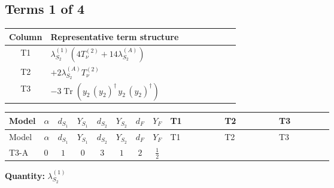 \documentclass[8pt]{article}
\begin{document}
\begin{landscape}
\subsection*{Terms 1 of 4}
\begin{center}
\begin{tabular}{@{}c >{\raggedright\arraybackslash}p{0.82\linewidth}@{}}
\toprule
Column & Representative term structure \\
\midrule
T1 & \(\displaystyle {\lambda_{S_2}^{(1)}} (4 T_{\nu}^{(2)}+14 {\lambda_{S_2}^{(A)}})\) \\
\midrule
T2 & \(\displaystyle +2 {\lambda_{S_2}^{(A)}} T_{\nu}^{(2)}\) \\
\midrule
T3 & \(\displaystyle -3 \operatorname{Tr}\!\left({y_2}\,\left({y_2}\right)^{\dagger}\,{y_2}\,\left({y_2}\right)^{\dagger}\right)\) \\
\midrule
\bottomrule
\end{tabular}
\end{center}
\smallskip
\tiny
\begin{longtable}{@{}llcccccc >{\raggedright\arraybackslash}p{0.21\linewidth} >{\raggedright\arraybackslash}p{0.21\linewidth} >{\raggedright\arraybackslash}p{0.21\linewidth}@{}}
\toprule
Model & $\alpha$ & $d_{S_1}$ & $Y_{S_1}$ & $d_{S_2}$ & $Y_{S_2}$ & $d_F$ & $Y_F$ & T1 & T2 & T3 \\
\midrule
\endfirsthead
\toprule
Model & $\alpha$ & $d_{S_1}$ & $Y_{S_1}$ & $d_{S_2}$ & $Y_{S_2}$ & $d_F$ & $Y_F$ & T1 & T2 & T3 \\
\midrule
\endhead
T3-A & $0$ & $1$ & $0$ & $3$ & $1$ & $2$ & $\frac{1}{2}$ & \scriptsize\adjustbox{max width=\linewidth}{$\begin{gathered} {\lambda_{S_2}^{(1)}} (4 T_{\nu}^{(2)}+14 {\lambda_{S_2}^{(A)}})\end{gathered}$} & \scriptsize\adjustbox{max width=\linewidth}{$\begin{gathered} +2 {\lambda_{S_2}^{(A)}} T_{\nu}^{(2)}\end{gathered}$} & \scriptsize\adjustbox{max width=\linewidth}{$\begin{gathered} -3 \operatorname{Tr}\!\left({y_2}\,\left({y_2}\right)^{\dagger}\,{y_2}\,\left({y_2}\right)^{\dagger}\right)\end{gathered}$} \\
\midrule
\bottomrule
\end{longtable}
\clearpage
\noindent\textbf{Quantity: }$\lambda_{S_2}^{(1)}$\par\smallskip

\end{landscape}
\end{document}
